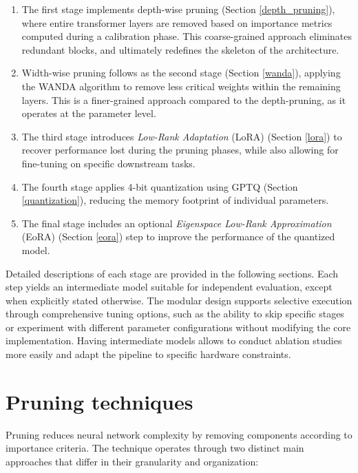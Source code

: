 \begin{enumerate}
    \item The first stage implements depth-wise pruning (Section \ref{depth_pruning}), where entire transformer layers are removed based on importance metrics computed during a calibration phase. This coarse-grained approach eliminates redundant blocks, and ultimately redefines the skeleton of the architecture.

    \item Width-wise pruning follows as the second stage (Section \ref{wanda}), applying the WANDA algorithm \cite{wanda} to remove less critical weights within the remaining layers. This is a finer-grained approach compared to the depth-pruning, as it operates at the parameter level.

    \item The third stage introduces \textit{Low-Rank Adaptation} (LoRA) \cite{lora} (Section \ref{lora}) to recover performance lost during the pruning phases, while also allowing for fine-tuning on specific downstream tasks.

    \item The fourth stage applies 4-bit quantization using GPTQ \cite{gptq_quantization} (Section \ref{quantization}), reducing the memory footprint of individual parameters.

    \item The final stage includes an optional \textit{Eigenspace Low-Rank Approximation} (EoRA) \cite{eora} (Section \ref{eora}) step to improve the performance of the quantized model.
\end{enumerate}

Detailed descriptions of each stage are provided in the following sections. Each step yields an intermediate model suitable for independent evaluation, except when explicitly stated otherwise. The modular design supports selective execution through comprehensive tuning options, such as the ability to skip specific stages or experiment with different parameter configurations without modifying the core implementation. Having intermediate models allows to conduct ablation studies more easily and adapt the pipeline to specific hardware constraints.


\section{Pruning techniques} \label{pruning}

Pruning reduces neural network complexity by removing components according to importance criteria. The technique operates through two distinct main approaches that differ in their granularity and organization:

